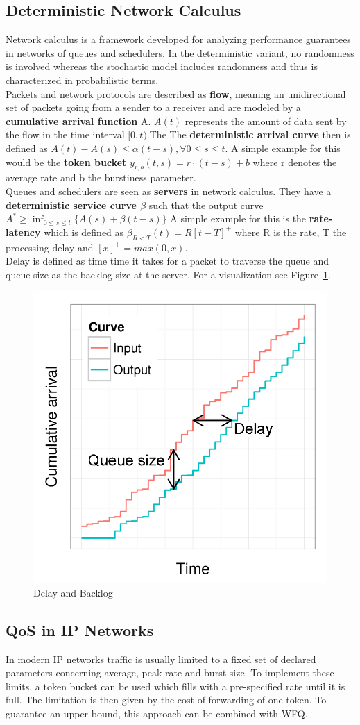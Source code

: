 \subsection{Deterministic Network Calculus}
Network calculus is a framework developed for analyzing performance guarantees in networks of queues and schedulers.
In the deterministic variant, no randomness is involved whereas the stochastic model includes randomness and thus is characterized in probabilistic terms.\\
Packets and network protocols are described as \textbf{flow}, meaning an unidirectional set of packets going from a sender to a receiver and are modeled by a \textbf{cumulative arrival function} A.
$A(t)$ represents the amount of data sent by the flow in the time interval $[0,t)$.The 
The \textbf{deterministic arrival curve} then is defined as $A(t) - A(s) \leq \alpha (t-s), \forall 0 \leq s \leq t$.
A simple example for this would be the \textbf{token bucket} $y_{r,b}(t,s) = r \cdot (t-s) + b$ where r denotes the average rate and b the burstiness parameter.\\
Queues and schedulers are seen as \textbf{servers} in network calculus.
They have a \textbf{deterministic service curve $\beta$} such that the output curve $A^* \geq \inf_{0 \leq s \leq t} \{A(s) + \beta (t-s)\}$
A simple example for this is the \textbf{rate-latency} which is defined as $\beta_{R<T}(t) = R[t - T]^+$ where R is the rate, T the processing delay and $[x]^+ = max(0,x)$.\\
Delay is defined as time time it takes for a packet to traverse the queue and queue size as the backlog size at the server.
For a visualization see Figure~\ref{fig:nc_delay_and_backlog}.
\begin{figure}[h]
  \centering
  \includegraphics[width=.4\textwidth]{figures/nc_delay_and_backlog.png}
  \caption{Delay and Backlog}\label{fig:nc_delay_and_backlog}
\end{figure}

\subsection{QoS in IP Networks}
In modern IP networks traffic is usually limited to a fixed set of declared parameters concerning average, peak rate and burst size.
To implement these limits, a token bucket can be used which fills with a pre-specified rate until it is full.
The limitation is then given by the cost of forwarding of one token.
To guarantee an upper bound, this approach can be combined with WFQ.

